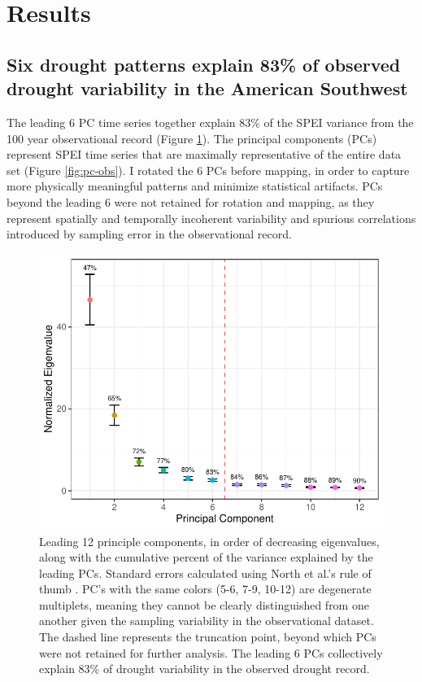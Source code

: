 \documentclass[11pt]{iopart}
\begin{document}
\section*{Results}

\subsection*{Six drought patterns explain 83\% of observed drought variability in the American Southwest}
The leading 6 PC time series together explain 83\% of the SPEI variance from the 100 year observational record (Figure \ref{fig:scree}). The principal components (PCs) represent SPEI time series that are maximally representative of the entire data set (Figure \ref{fig:pc-obs}). I rotated the 6 PCs before mapping, in order to capture more physically meaningful patterns and minimize statistical artifacts. PCs beyond the leading 6 were not retained for rotation and mapping, as they represent spatially and temporally incoherent variability and spurious correlations introduced by sampling error in the observational record. 

\begin{figure}[!ht]
\centering
\includegraphics[width=.8\linewidth]{figures/scree.pdf}
\caption{Leading 12 principle components, in order of decreasing eigenvalues, along with the cumulative percent of the variance explained by the leading PCs. Standard errors calculated using North et al.'s rule of thumb \parencite{North1982}. PC's with the same colors (5-6, 7-9, 10-12) are degenerate multiplets, meaning they cannot be clearly distinguished from one another given the sampling variability in the observational dataset. The dashed line represents the truncation point, beyond which PCs were not retained for further analysis. The leading 6 PCs collectively explain 83\% of drought variability in the observed drought record.}
\label{fig:scree}
\end{figure}
\end{document}
